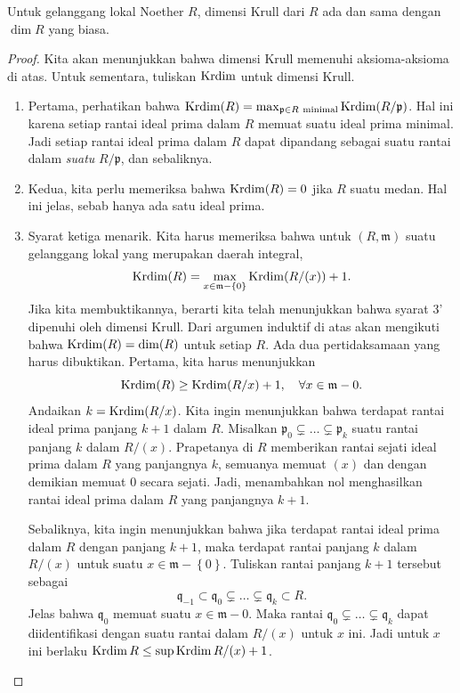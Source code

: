 \begin{theorem} 
Untuk gelanggang lokal Noether $R$, dimensi Krull dari $R$ ada dan sama
dengan $\dim R$ yang biasa.
\end{theorem}
\begin{proof} 
Kita akan menunjukkan bahwa dimensi Krull memenuhi aksioma-aksioma di atas. Untuk sementara,
tuliskan $\operatorname{Krdim}$ untuk dimensi Krull.

\begin{enumerate}
\item Pertama, perhatikan bahwa $\operatorname{Krdim}(R) = \max_{\mathfrak{p} \in R \
\mathrm{minimal}}  \operatorname{Krdim}(R/\mathfrak{p})$. Hal ini karena setiap rantai ideal
prima dalam $R$ memuat suatu ideal prima minimal. Jadi setiap rantai ideal prima dalam $R$ dapat
dipandang sebagai suatu rantai dalam \emph{suatu} $R/\mathfrak{p}$, dan sebaliknya.
\item Kedua, kita perlu memeriksa bahwa $\operatorname{Krdim}(R) = 0$ jika $R$ suatu medan. Hal ini
jelas, sebab hanya ada satu ideal prima.
\item Syarat ketiga menarik. Kita harus memeriksa bahwa untuk $(R,
\mathfrak{m})$ suatu gelanggang lokal yang merupakan
daerah integral, 
\[ \operatorname{Krdim}(R) = \max_{x \in \mathfrak{m} - \left\{0\right\}} \operatorname{Krdim}(R/(x)) + 1.  \]
Jika kita membuktikannya, berarti kita telah menunjukkan bahwa syarat 3' dipenuhi oleh
dimensi Krull. Dari argumen induktif di atas akan mengikuti bahwa $\operatorname{Krdim}(R)
= \mathrm{dim} (R)$ untuk setiap $R$. 
Ada dua pertidaksamaan yang harus dibuktikan. Pertama, kita harus menunjukkan
\[ \operatorname{Krdim}(R) \geq \operatorname{Krdim}(R/x) +1, \quad \forall x \in \mathfrak{m} - 0.  \]
Andaikan $k = \operatorname{Krdim}(R/x)$. Kita ingin menunjukkan bahwa terdapat rantai ideal
prima panjang $k+1$ dalam $R$. Misalkan $\mathfrak{p}_0 \subsetneq \dots
\subsetneq \mathfrak{p}_k$ suatu rantai panjang $k$ dalam $R/(x)$. Prapetanya
di $R$ memberikan rantai sejati ideal prima dalam $R$ yang panjangnya $k$, semuanya
memuat $(x)$ dan dengan demikian memuat $0$ secara sejati. Jadi, menambahkan nol menghasilkan rantai
ideal prima dalam $R$ yang panjangnya $k+1$. 

Sebaliknya, kita ingin menunjukkan bahwa jika terdapat rantai ideal prima dalam $R$ dengan
panjang $k+1$, maka terdapat rantai panjang $k$ dalam $R/(x)$ untuk suatu $x \in
\mathfrak{m} - \left\{0\right\}$. Tuliskan rantai panjang $k+1$ tersebut sebagai
\[ \mathfrak{q}_{-1} \subset \mathfrak{q}_0 \subsetneq \dots \subsetneq
\mathfrak{q}_k \subset R . \]
Jelas bahwa $\mathfrak{q}_0$ memuat suatu $x \in \mathfrak{m} - 0$. Maka rantai
$\mathfrak{q}_0 \subsetneq \dots \subsetneq \mathfrak{q}_k$ dapat
diidentifikasi dengan suatu rantai dalam $R/(x)$ untuk $x$ ini. Jadi untuk $x$ ini berlaku
$\operatorname{Krdim} R \leq \sup \operatorname{Krdim} R/(x) + 1$.
\end{enumerate}
\end{proof} 

